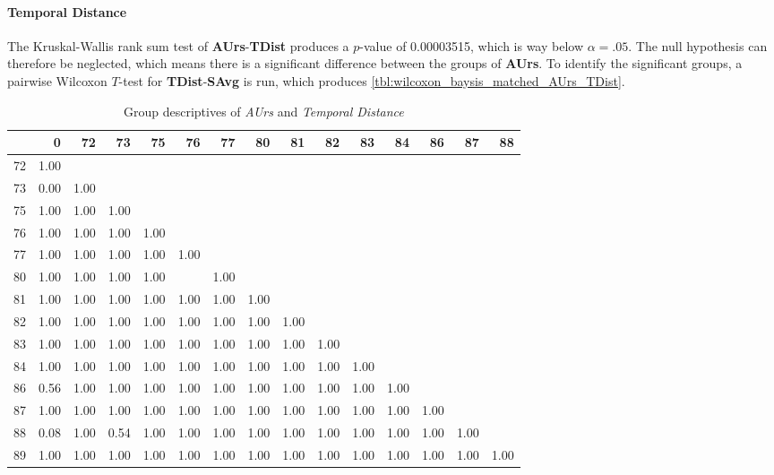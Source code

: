 \paragraph{Temporal Distance}
The Kruskal-Wallis rank sum test of \textbf{AUrs}-\textbf{TDist} produces a $p$-value of 0.00003515, which is way below $\alpha=.05$. The null hypothesis can therefore be neglected, which means there is a significant difference between the groups of \textbf{AUrs}. To identify the significant groups, a pairwise Wilcoxon $T$-test for \textbf{TDist}-\textbf{SAvg} is run, which produces \autoref{tbl:wilcoxon_baysis_matched_AUrs_TDist}.
\begin{table}[ht]
	\small
	\centering
	\begin{tabular}{rrrrrrrrrrrrrrr}
        \toprule
        & 0 & 72 & 73 & 75 & 76 & 77 & 80 & 81 & 82 & 83 & 84 & 86 & 87 & 88 \\ 
        \midrule
        72 & 1.00 &  &  &  &  &  &  &  &  &  &  &  &  &  \\ 
        73 & 0.00 & 1.00 &  &  &  &  &  &  &  &  &  &  &  &  \\ 
        75 & 1.00 & 1.00 & 1.00 &  &  &  &  &  &  &  &  &  &  &  \\ 
        76 & 1.00 & 1.00 & 1.00 & 1.00 &  &  &  &  &  &  &  &  &  &  \\ 
        77 & 1.00 & 1.00 & 1.00 & 1.00 & 1.00 &  &  &  &  &  &  &  &  &  \\ 
        80 & 1.00 & 1.00 & 1.00 & 1.00 &  & 1.00 &  &  &  &  &  &  &  &  \\ 
        81 & 1.00 & 1.00 & 1.00 & 1.00 & 1.00 & 1.00 & 1.00 &  &  &  &  &  &  &  \\ 
        82 & 1.00 & 1.00 & 1.00 & 1.00 & 1.00 & 1.00 & 1.00 & 1.00 &  &  &  &  &  &  \\ 
        83 & 1.00 & 1.00 & 1.00 & 1.00 & 1.00 & 1.00 & 1.00 & 1.00 & 1.00 &  &  &  &  &  \\ 
        84 & 1.00 & 1.00 & 1.00 & 1.00 & 1.00 & 1.00 & 1.00 & 1.00 & 1.00 & 1.00 &  &  &  &  \\ 
        86 & 0.56 & 1.00 & 1.00 & 1.00 & 1.00 & 1.00 & 1.00 & 1.00 & 1.00 & 1.00 & 1.00 &  &  &  \\ 
        87 & 1.00 & 1.00 & 1.00 & 1.00 & 1.00 & 1.00 & 1.00 & 1.00 & 1.00 & 1.00 & 1.00 & 1.00 &  &  \\ 
        88 & 0.08 & 1.00 & 0.54 & 1.00 & 1.00 & 1.00 & 1.00 & 1.00 & 1.00 & 1.00 & 1.00 & 1.00 & 1.00 &  \\ 
        89 & 1.00 & 1.00 & 1.00 & 1.00 & 1.00 & 1.00 & 1.00 & 1.00 & 1.00 & 1.00 & 1.00 & 1.00 & 1.00 & 1.00 \\ 
        \bottomrule
	  \end{tabular}
	\caption{Group descriptives of \textit{AUrs} and \textit{Temporal Distance}}
	\label{tbl:wilcoxon_baysis_matched_AUrs_TDist}
\end{table}

